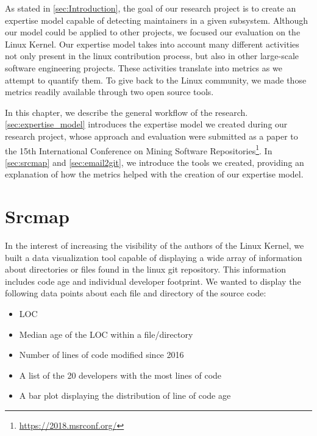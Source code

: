\label{sec:Theme1}



As stated in \autoref{sec:Introduction}, the goal of our research project is to create an expertise model capable of detecting maintainers in a given subsystem. Although our model could be applied to other projects, we focused our evaluation on the Linux Kernel.
Our expertise model takes into account many different activities not only present in the linux contribution process, but also in other large-scale software engineering projects. These activities translate into metrics as we attempt to quantify them. To give back to the Linux community, we made those metrics readily available through two open source tools.

In this chapter, we describe the general workflow of the research. \autoref{sec:expertise_model} introduces the expertise model we created during our research project, whose approach and evaluation were submitted as a paper to the 15th International Conference on Mining Software Repositories\footnote{\url{https://2018.msrconf.org/}}. In \autoref{sec:srcmap} and \autoref{sec:email2git}, we introduce the tools we created, providing an explanation of how the metrics helped with the creation of our expertise model. 





\section{Srcmap}
\label{sec:srcmap}

In the interest of increasing the visibility of the authors of the Linux Kernel, we built a data visualization tool capable of displaying a wide array of information about directories or files found in the linux git repository. This information includes code age and individual developer footprint. We wanted to display the following data points about each file and directory of the source code:

\begin{itemize}
	\item \ac{LOC}
	\item Median age of the \ac{LOC} within a file/directory
	\item Number of lines of code modified since 2016
	\item A list of the 20 developers with the most lines of code
	\item A bar plot displaying the distribution of line of code age
\end{itemize}

